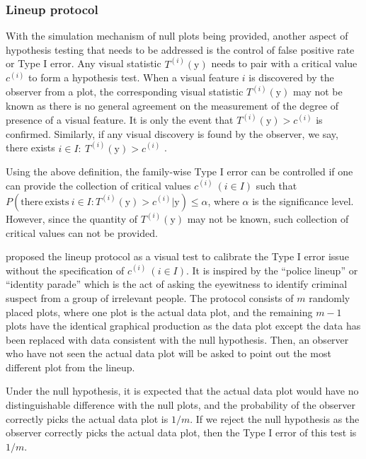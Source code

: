 \documentclass[]{interact}
\theoremstyle{plain}%
\theoremstyle{definition}
\theoremstyle{remark}
\begin{document}
\hypertarget{se:lineup}{%
\subsubsection{Lineup protocol}\label{se:lineup}}

With the simulation mechanism of null plots being provided, another
aspect of hypothesis testing that needs to be addressed is the control
of false positive rate or Type I error. Any visual statistic
\(T^{(i)}(\boldsymbol{\mathrm{y}})\) needs to pair with a critical value
\(c^{(i)}\) to form a hypothesis test. When a visual feature \(i\) is
discovered by the observer from a plot, the corresponding visual
statistic \(T^{(i)}(\boldsymbol{\mathrm{y}})\) may not be known as there
is no general agreement on the measurement of the degree of presence of
a visual feature. It is only the event that
\(T^{(i)}(\boldsymbol{\mathrm{y}}) > c^{(i)}\) is confirmed. Similarly,
if any visual discovery is found by the observer, we say, there exists
\(i \in I:~T^{(i)}(\boldsymbol{\mathrm{y}}) > c^{(i)}\)
\citep{buja_statistical_2009}.

Using the above definition, the family-wise Type I error can be
controlled if one can provide the collection of critical values
\(c^{(i)}~(i \in I)\) such that
\(P(\mathrm{there~exists~} i \in I: T^{(i)}(\boldsymbol{\mathrm{y}}) > c^{(i)}|\boldsymbol{\mathrm{y}}) \leq \alpha\),
where \(\alpha\) is the significance level. However, since the quantity
of \(T^{(i)}(\boldsymbol{\mathrm{y}})\) may not be known, such
collection of critical values can not be provided.

\citet{buja_statistical_2009} proposed the lineup protocol as a visual
test to calibrate the Type I error issue without the specification of
\(c^{(i)}~(i \in I)\). It is inspired by the ``police lineup'' or
``identity parade'' which is the act of asking the eyewitness to
identify criminal suspect from a group of irrelevant people. The
protocol consists of \(m\) randomly placed plots, where one plot is the
actual data plot, and the remaining \(m - 1\) plots have the identical
graphical production as the data plot except the data has been replaced
with data consistent with the null hypothesis. Then, an observer who
have not seen the actual data plot will be asked to point out the most
different plot from the lineup.

Under the null hypothesis, it is expected that the actual data plot
would have no distinguishable difference with the null plots, and the
probability of the observer correctly picks the actual data plot is
\(1/m\). If we reject the null hypothesis as the observer correctly
picks the actual data plot, then the Type I error of this test is
\(1/m\).
\end{document}
